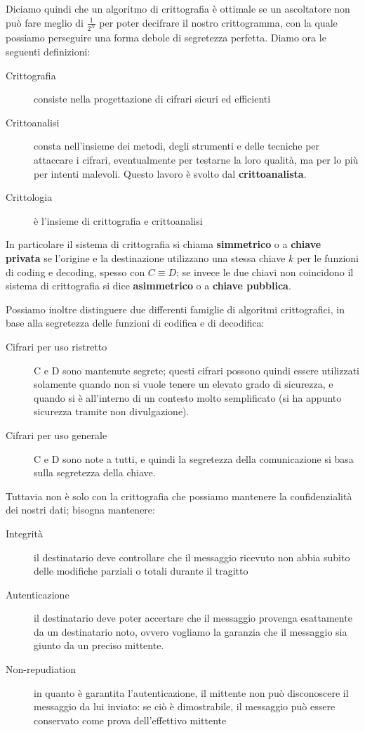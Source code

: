Diciamo quindi che un algoritmo di crittografia è ottimale se un ascoltatore
non può fare meglio di $\frac{1}{2^N}$ per poter decifrare il nostro crittogramma,
con la quale possiamo perseguire una forma debole di segretezza perfetta.
Diamo ora le seguenti definizioni:
\begin{description}
\item[Crittografia] consiste nella progettazione di cifrari sicuri ed efficienti
\item[Crittoanalisi] consta nell'insieme dei metodi, degli strumenti
	e delle tecniche per attaccare i cifrari,  eventualmente per
	testarne la loro qualità, ma per lo più per intenti malevoli. Questo
	lavoro è svolto dal \textbf{crittoanalista}.
\item[Crittologia] è l'insieme di crittografia e crittoanalisi
\end{description}

In particolare il sistema di crittografia si chiama \textbf{simmetrico} o a \textbf{chiave
privata} se l'origine
e la destinazione utilizzano una stessa chiave $k$ per le funzioni di coding
e decoding, spesso con $C\equiv D$; se invece le due chiavi non coincidono
il sistema di crittografia si dice \textbf{asimmetrico} o a \textbf{chiave pubblica}.

Possiamo inoltre distinguere due differenti famiglie di algoritmi crittografici,
in base alla segretezza delle funzioni di codifica e di decodifica:
\begin{description}
\item[Cifrari per uso ristretto] C e D sono mantenute segrete; questi cifrari
	possono quindi essere utilizzati solamente quando non si vuole tenere
	un elevato grado di sicurezza, e quando si è all'interno di un contesto
	molto semplificato (si ha appunto sicurezza tramite non divulgazione).
\item[Cifrari per uso generale] C e D sono note a tutti, e quindi la segretezza
	della comunicazione si basa sulla segretezza della chiave.
\end{description}

Tuttavia non è solo con la crittografia che possiamo mantenere la confidenzialità
dei nostri dati; bisogna mantenere:
\begin{description}
\item[Integrità] il destinatario deve controllare che il messaggio ricevuto 
	non abbia subito delle modifiche parziali o totali durante il tragitto
\item[Autenticazione] il destinatario deve poter accertare che il messaggio
	provenga esattamente da un destinatario noto, ovvero vogliamo la 
	garanzia che il messaggio sia giunto da un preciso mittente.
\item[Non-repudiation] in quanto è garantita l'autenticazione, il mittente
	non può disconoscere il messaggio da lui inviato: se ciò è dimostrabile,
	il messaggio può essere conservato come prova dell'effettivo mittente
\end{description}

